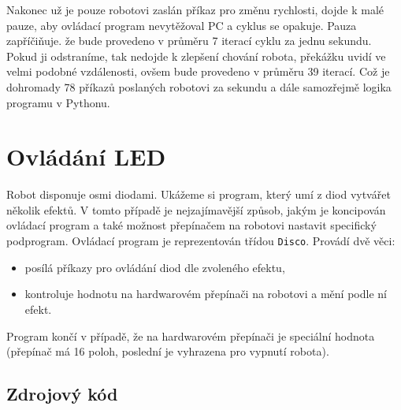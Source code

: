 \documentclass[12pt,notitlepage]{report}
\newcommand{\code}[1]{\texttt{\small #1}}
\begin{document}
Nakonec už je pouze robotovi zaslán příkaz pro změnu rychlosti, dojde k malé
pauze, aby ovládací program nevytěžoval PC a cyklus se opakuje. Pauza
zapříčiňuje. že bude provedeno v průměru 7 iterací cyklu za jednu sekundu.
Pokud ji odstraníme, tak nedojde k zlepšení chování robota, překážku uvidí ve
velmi podobné vzdálenosti, ovšem bude provedeno v průměru 39 iterací. Což je
dohromady 78 příkazů poslaných robotovi za sekundu a dále samozřejmě logika
programu v Pythonu.

\section{Ovládání LED}
\label{LED}

Robot disponuje osmi diodami. Ukážeme si program, který umí z diod vytvářet
několik efektů. V tomto případě je nejzajímavější způsob, jakým je koncipován
ovládací program a také možnost přepínačem na robotovi nastavit specifický
podprogram.
Ovládací program je reprezentován třídou \code{Disco}. Provádí dvě věci:

\begin{itemize}
    \item posílá příkazy pro ovládání diod dle zvoleného efektu,
    \item kontroluje hodnotu na hardwarovém přepínači na robotovi a mění podle
        ní efekt.
\end{itemize}

Program končí v případě, že na hardwarovém přepínači je speciální hodnota
(přepínač má 16 poloh, poslední je vyhrazena pro vypnutí robota).

\subsection{Zdrojový kód}
\end{document}
